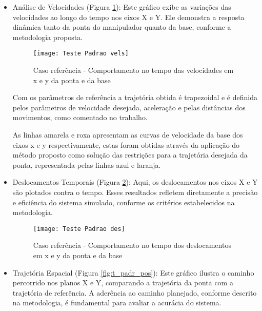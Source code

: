 \begin{itemize}
    \item Análise de Velocidades (Figura \ref{fig:t_padr_vels}): Este gráfico exibe as variações das velocidades ao longo do tempo nos eixos X e Y. Ele demonstra a resposta dinâmica tanto da ponta do manipulador quanto da base, conforme a metodologia proposta.

    \begin{figure}[H]
        \begin{center}
        \caption{Caso referência - Comportamento no tempo das velocidades em x e y da ponta e da base}
        \texttt{[image: Teste Padrao vels]}
        \label{fig:t_padr_vels}
        \end{center}
    \end{figure}
    
    Com os parâmetros de referência a trajetória obtida é trapezoidal e é definida pelos parâmetros de velocidade desejada, aceleração e pelas distâncias dos movimentos, como comentado no trabalho.
    
    As linhas amarela e roxa apresentam as curvas de velocidade da base dos eixos x e y respectivamente, estas foram obtidas através da aplicação do método proposto como solução das restrições para a trajetória desejada da ponta, representada pelas linhas azul e laranja.

    \item Deslocamentos Temporais (Figura \ref{fig:t_padr_des}): Aqui, os deslocamentos nos eixos X e Y são plotados contra o tempo. Esses resultados refletem diretamente a precisão e eficiência do sistema simulado, conforme os critérios estabelecidos na metodologia.

    \begin{figure}[H]
        \begin{center}
        \caption{Caso referência - Comportamento no tempo dos deslocamentos em x e y da ponta e da base}
        \texttt{[image: Teste Padrao des]}
        \label{fig:t_padr_des}
        \end{center}
    \end{figure}    

    \item Trajetória Espacial (Figura \ref{fig:t_padr_pos}): Este gráfico ilustra o caminho percorrido nos planos X e Y, comparando a trajetória da ponta com a trajetória de referência. A aderência ao caminho planejado, conforme descrito na metodologia, é fundamental para avaliar a acurácia do sistema.


\end{itemize}
